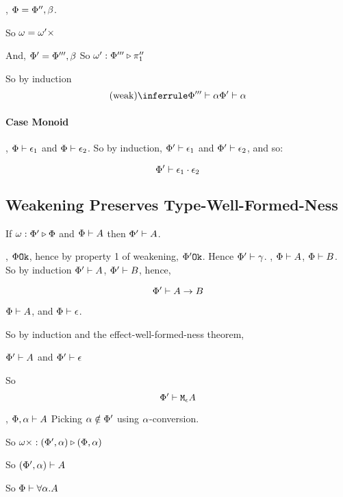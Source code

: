 {    \bi, $\Phi = \Phi'', \beta$.

    So $\omega = \omega'\times$

    And, $\Phi' = \Phi''', \beta$
    So \bi $\omega' : \Phi''' \triangleright \pi_1''$

    So by induction
    \begin{equation}
        \ntreeruleI{weak}{\wellformed{\P'''}{\a}}{\wellformed{\P'}{\a}}
    \end{equation}


    \paragraph{Case Monoid}

    \bi, $\Phi\vdash \epsilon_1$ and $\Phi\vdash \epsilon_2$. So by induction,
    $\Phi'\vdash \epsilon_1$ and $\Phi'\vdash \epsilon_2$, and so:

    \begin{equation}
        \Phi'\vdash \epsilon_1\cdot\epsilon_2
    \end{equation}
    \subsection{Weakening Preserves Type-Well-Formed-Ness}

    If $\omega : \Phi' \triangleright \Phi$ and $\Phi\vdash A$ then $\Phi'\vdash A$.

    \proof
    \bi, $\Phi \texttt{Ok}$, hence by property 1 of weakening, $\Phi' \texttt{Ok}$. Hence $\Phi'\vdash \gamma$.
    \bi, $\Phi\vdash A$, $\Phi\vdash B$.
    So by induction $\Phi'\vdash A$, $\Phi'\vdash B$, hence,

    $$\Phi'\vdash A\rightarrow B$$


    \bi $\Phi\vdash A$, and $\Phi\vdash \epsilon$.

    So by induction and the effect-well-formed-ness theorem, 

    $\Phi'\vdash A$ and $\Phi'\vdash \epsilon$

    So $$\Phi'\vdash \texttt{M}_{\epsilon}{A}$$

    \bi, $\Phi,\alpha\vdash A$
    Picking $\alpha\notin\Phi'$ using $\alpha$-conversion.

    So $\omega\times : (\Phi', \alpha) \triangleright (\Phi, \alpha)$

    So $(\Phi', \alpha)\vdash A$

    So $\Phi\vdash \forall \alpha. A$

}
